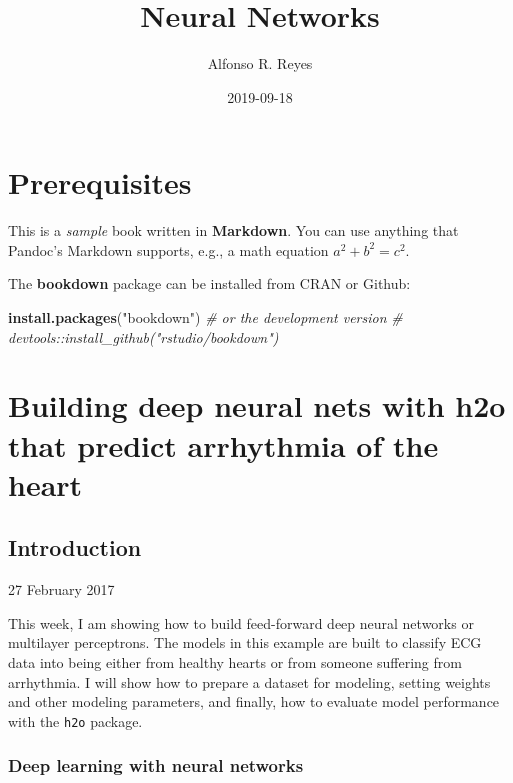 \documentclass[]{book}
\title{Neural Networks}
\author{Alfonso R. Reyes}
\date{2019-09-18}
\newenvironment{Shaded}{\begin{snugshade}}{\end{snugshade}}
\newcommand{\CommentTok}[1]{\textcolor[rgb]{0.56,0.35,0.01}{\textit{#1}}}
\newcommand{\KeywordTok}[1]{\textcolor[rgb]{0.13,0.29,0.53}{\textbf{#1}}}
\newcommand{\NormalTok}[1]{#1}
\newcommand{\StringTok}[1]{\textcolor[rgb]{0.31,0.60,0.02}{#1}}
\begin{document}
\maketitle

{
\setcounter{tocdepth}{1}
\tableofcontents
}
\hypertarget{prerequisites}{%
\chapter*{Prerequisites}\label{prerequisites}}

This is a \emph{sample} book written in \textbf{Markdown}. You can use anything that Pandoc's Markdown supports, e.g., a math equation \(a^2 + b^2 = c^2\).

The \textbf{bookdown} package can be installed from CRAN or Github:

\begin{Shaded}
\begin{Highlighting}[]
\KeywordTok{install.packages}\NormalTok{(}\StringTok{"bookdown"}\NormalTok{)}
\CommentTok{# or the development version}
\CommentTok{# devtools::install_github("rstudio/bookdown")}
\end{Highlighting}
\end{Shaded}

\hypertarget{building-deep-neural-nets-with-h2o-that-predict-arrhythmia-of-the-heart}{%
\chapter{Building deep neural nets with h2o that predict arrhythmia of the heart}\label{building-deep-neural-nets-with-h2o-that-predict-arrhythmia-of-the-heart}}

\hypertarget{introduction}{%
\section{Introduction}\label{introduction}}

27 February 2017

This week, I am showing how to build feed-forward deep neural networks or multilayer perceptrons. The models in this example are built to classify ECG data into being either from healthy hearts or from someone suffering from arrhythmia. I will show how to prepare a dataset for modeling, setting weights and other modeling parameters, and finally, how to evaluate model performance with the \texttt{h2o} package.

\hypertarget{deep-learning-with-neural-networks}{%
\subsection{Deep learning with neural networks}\label{deep-learning-with-neural-networks}}
\end{document}
